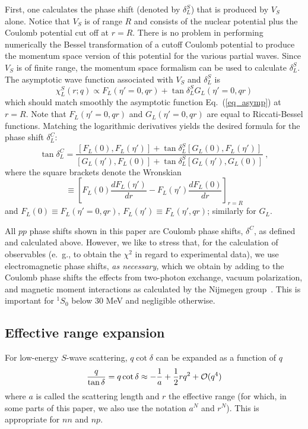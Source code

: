 First, one calculates the phase shift (denoted by $\delta^S_L$)
that is produced by $V_S$ alone. 
Notice that $V_S$ is of range $R$ and consists of
the nuclear potential plus the Coulomb potential 
cut off at $r=R$. There is no problem in performing numerically the Bessel 
transformation of a cutoff Coulomb potential to produce the momentum
space version of this potential for the various partial waves. 
Since $V_S$ is of finite
range, the momentum space formalism can be used to calculate $\delta^S_L$.
The asymptotic wave function associated with $V_S$ and $\delta^S_L$ is
\begin{equation}
\chi_L^S(r;q) \propto
F_L (\eta'=0,qr) + \tan \delta^S_L G_L(\eta'=0,qr)
\end{equation}
which should match smoothly the asymptotic
function Eq.~(\ref{eq_asymp}) at $r=R$. Note that
$F_L (\eta'=0,qr)$ and $G_L(\eta'=0,qr)$ are equal to
Riccati-Bessel functions.
Matching the logarithmic derivatives yields the desired formula
for the phase shift $\delta^C_L$:
\begin{equation}
\tan \delta^C_L = 
\frac{
[F_L(0),F_L(\eta')] 
+ \tan \delta^S_L
[G_L(0),F_L(\eta')] 
}{
[G_L(\eta'),F_L(0)] 
+ \tan \delta^S_L
[G_L(\eta'),G_L(0)] 
}
\: ,
\end{equation}
where the square brackets denote the Wronskian
\begin{equation}
[F_L(0),F_L(\eta')] 
\equiv
\left[ 
F_L(0) \frac{d F_L(\eta')}{dr}
-
F_L(\eta') \frac{d F_L(0)}{dr}
\right]_{r=R}
\end{equation}
and
$F_L(0)\equiv F_L(\eta'=0,qr)$,
$F_L(\eta')\equiv F_L(\eta',qr)$;
similarly for $G_L$.

All $pp$ phase shifts shown in this paper are Coulomb phase shifts,
$\delta^C$, as defined and calculated above. However, we like to stress
that, for the calculation of observables (e.~g., to obtain
the $\chi^2$ in regard to experimental data),
we use electromagnetic phase shifts, {\it as necessary,} 
which we obtain by adding to
the Coulomb phase shifts the effects from two-photon exchange, vacuum
polarization, and magnetic moment interactions
as calculated by the Nijmegen group~\cite{Ber88,Sto95}.
This is important for $^1S_0$ below 30 MeV and negligible otherwise.



\subsection{Effective range expansion}
For low-energy $S$-wave scattering, $q\cot \delta$ can be expanded as a 
function of $q$
\begin{equation}
\frac{q}{\tan \delta}=q\cot \delta\approx -\frac{1}{a}+\frac12 r q^2
 + {\cal O}(q^4)
\label{24.1}
\end{equation}
where $a$ is called the scattering length and $r$ the effective range
(for which, in some parts of this paper, we also use the notation
$a^N$ and $r^N$).
This is appropriate for $nn$ and $np$. 

